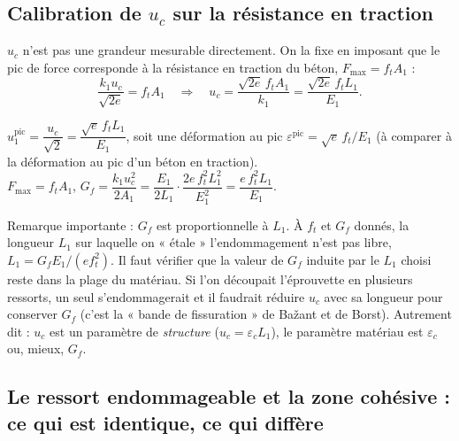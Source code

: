 \documentclass[11pt,a4paper]{article}
\newcommand{\uc}{u_c}
\begin{document}
\subsection{Calibration de $\uc$ sur la résistance en traction}
\label{sec:uc}
$\uc$ n'est pas une grandeur mesurable directement. On la fixe en imposant que le pic de force
corresponde à la résistance en traction du béton, $F_{\max} = f_tA_1$ :
\begin{equation}
  \frac{k_1\uc}{\sqrt{2e}} = f_tA_1
  \quad\Longrightarrow\quad
  \uc = \frac{\sqrt{2e}\,f_tA_1}{k_1} = \frac{\sqrt{2e}\,f_tL_1}{E_1}.
\end{equation}
\begin{alamain}
$u_1^{\text{pic}} = \dfrac{\uc}{\sqrt2} = \dfrac{\sqrt e\,f_tL_1}{E_1}$, soit une déformation au pic
$\varepsilon^{\text{pic}} = \sqrt e\,f_t/E_1$ (à comparer à la déformation au pic d'un béton en traction).\\
$F_{\max} = f_tA_1$, \qquad
$G_f = \dfrac{k_1\uc^2}{2A_1} = \dfrac{E_1}{2L_1}\cdot\dfrac{2e\,f_t^2L_1^2}{E_1^2} = \dfrac{e\,f_t^2L_1}{E_1}$.
\end{alamain}
Remarque importante : $G_f$ est proportionnelle à $L_1$. À $f_t$ et $G_f$ donnés, la longueur $L_1$
sur laquelle on « étale » l'endommagement n'est pas libre, $L_1 = G_fE_1/(e f_t^2)$. Il faut
vérifier que la valeur de $G_f$ induite par le $L_1$ choisi reste dans la plage du matériau. Si
l'on découpait l'éprouvette en plusieurs ressorts, un seul s'endommagerait et il faudrait réduire
$\uc$ avec sa longueur pour conserver $G_f$ (c'est la « bande de fissuration » de Bažant et de
Borst). Autrement dit : $\uc$ est un paramètre de \emph{structure} ($\uc = \varepsilon_c L_1$), le
paramètre matériau est $\varepsilon_c$ ou, mieux, $G_f$.

\subsection{Le ressort endommageable et la zone cohésive : ce qui est identique, ce qui diffère}
\label{sec:czm}
\end{document}
